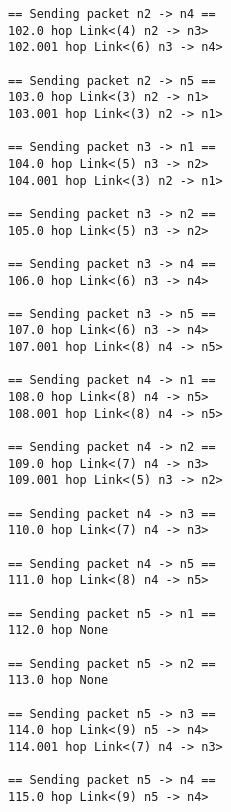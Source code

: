\documentclass[fleqn,11pt]{article}
\begin{document}
\begin{verbatim}
== Sending packet n2 -> n4 ==
102.0 hop Link<(4) n2 -> n3>
102.001 hop Link<(6) n3 -> n4>
                                        
== Sending packet n2 -> n5 ==
103.0 hop Link<(3) n2 -> n1>
103.001 hop Link<(3) n2 -> n1>
                                        
== Sending packet n3 -> n1 ==
104.0 hop Link<(5) n3 -> n2>
104.001 hop Link<(3) n2 -> n1>
                                        
== Sending packet n3 -> n2 ==
105.0 hop Link<(5) n3 -> n2>
                                        
== Sending packet n3 -> n4 ==
106.0 hop Link<(6) n3 -> n4>
                                        
== Sending packet n3 -> n5 ==
107.0 hop Link<(6) n3 -> n4>
107.001 hop Link<(8) n4 -> n5>
                                        
== Sending packet n4 -> n1 ==
108.0 hop Link<(8) n4 -> n5>
108.001 hop Link<(8) n4 -> n5>
                                        
== Sending packet n4 -> n2 ==
109.0 hop Link<(7) n4 -> n3>
109.001 hop Link<(5) n3 -> n2>
                                        
== Sending packet n4 -> n3 ==
110.0 hop Link<(7) n4 -> n3>
                                        
== Sending packet n4 -> n5 ==
111.0 hop Link<(8) n4 -> n5>
                                        
== Sending packet n5 -> n1 ==
112.0 hop None
                                        
== Sending packet n5 -> n2 ==
113.0 hop None
                                        
== Sending packet n5 -> n3 ==
114.0 hop Link<(9) n5 -> n4>
114.001 hop Link<(7) n4 -> n3>
                                        
== Sending packet n5 -> n4 ==
115.0 hop Link<(9) n5 -> n4>
\end{verbatim}
\end{document}
